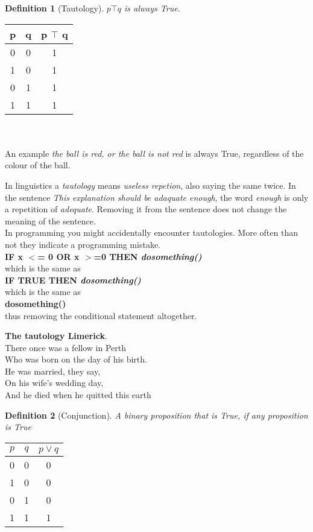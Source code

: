 \documentclass[10pt,a4paper,draft,titlepage,onecolumn]{book}
\newtheorem{definition}{Definition}[section]
\begin{document}
\begin{definition}[Tautology]
$p \top q $ is always True.
\end{definition}
\begin{tabular}{ |c|c|c| }
 \hline
 p & q &  p $\top$  q  \\
 \hline
 0 & 0 & 1 \\
 1 & 0 & 1\\
 0 & 1 & 1\\
 1 & 1 & 1\\
 \hline
\end{tabular}  \\\\
An example \textit{the ball is red, or the ball is not red} is always True, regardless of the colour of the ball.

In linguistics a \textit {tautology} means \textit{useless repetion}, also {saying the same twice}. In the sentence \textit{This explanation should be adaquate enough}, the word \textit{enough} is only a repetition of \textit{adequate}. Removing it from the sentence does not change the meaning of the sentence. \\

In programming you might accidentally encounter tautologies. More often than not they indicate a programming mistake. \\
\textbf{IF x $<$= 0 OR  x $>$=0 THEN \textit{dosomething()}}\\
which is the same as \\
\textbf{IF TRUE THEN \textit{dosomething()}}\\
which is the same as \\
\textbf{dosomething()}\\
thus removing the conditional statement altogether.



\begin{center} 
\textbf{The tautology Limerick}.\\
There once was a fellow in Perth \\
Who was born on the day of his birth. \\
He was married, they say, \\
On his wife's wedding day, \\
And he died when he quitted this earth 
\end{center}


\begin{definition}[Conjunction] A  binary proposition that is True, if any proposition is True
\end{definition}  
\begin{tabular}{ |c|c|c| }
 \hline
 $p$ & $q$ &  $p \vee q $ \\
 \hline
 0 & 0 & 0 \\
 1 & 0 & 0\\
 0 & 1 & 0\\
 1 & 1 & 1\\
 \hline
\end{tabular}\\\\
\end{document}
